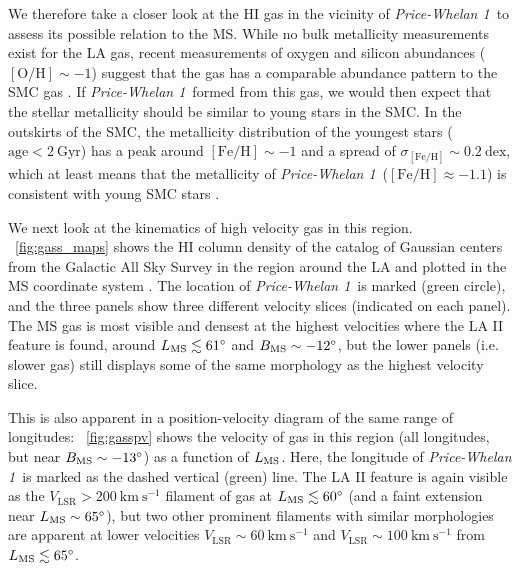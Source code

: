 \documentclass[twocolumn]{aastex62}
\newcommand{\kms}{\ensuremath{\textrm{km}~\textrm{s}^{-1}}}
\newcommand{\feh}{\ensuremath{[\textrm{Fe} / \textrm{H}]}}
\newcommand{\hi}{H{\footnotesize I} }
\newcommand{\clustername}{\textsl{Price-Whelan 1}}
\begin{document}
We therefore take a closer look at the \hi gas in the vicinity of \clustername\ to assess its possible relation to the MS.
While no bulk metallicity measurements exist for the LA gas, recent measurements of oxygen and silicon abundances ($[\textrm{O}/\textrm{H}] \sim -1$) suggest that the gas has a comparable abundance pattern to the SMC gas \citep{Fox:2013, Fox:2018, Richter:2018}.
If \clustername\ formed from this gas, we would then expect that the stellar metallicity should be similar to young stars in the SMC.
In the outskirts of the SMC, the metallicity distribution of the youngest stars ($\textrm{age} < 2~\textrm{Gyr}$) has a peak around $\feh \sim -1$ and a spread of $\sigma_{\feh} \sim 0.2~\textrm{dex}$, which at least means that the metallicity of \clustername\ ($\feh \approx -1.1$) is consistent with young SMC stars \citep{Dobbie:2014}.

We next look at the kinematics of high velocity gas in this region.
\figurename~\ref{fig:gass_maps} shows the \hi column density of the catalog of Gaussian centers \citep[producted with the techniques and software from][]{Nidever:2008} from the Galactic All Sky Survey \citep[GASS;][]{McClure-Griffiths:2009, Kalberla:2010} in the region around the LA and plotted in the MS coordinate system \citep[$L_{\rm MS}, B_{\rm MS}$;][]{Nidever:2008}.
The location of \clustername\ is marked (green circle), and the three panels show three different velocity slices (indicated on each panel).
The MS gas is most visible and densest at the highest velocities where the LA II feature is found, around $L_{\rm MS} \lesssim 61^\circ$ and $B_{\rm MS} \sim -12^\circ$, but the lower panels (i.e. slower gas) still displays some of the same morphology as the highest velocity slice.

This is also apparent in a position-velocity diagram of the same range of longitudes:
\figurename~\ref{fig:gasspv} shows the velocity of gas in this region (all longitudes, but near $B_{\rm MS} \sim -13^\circ$) as a function of $L_{\rm MS}$.
Here, the longitude of \clustername\ is marked as the dashed vertical (green) line.
The LA II feature is again visible as the $V_{\textrm{LSR}} > 200~\kms$ filament of gas at $L_{\rm MS} \lesssim 60^\circ$ (and a faint extension near $L_{\rm MS} \sim 65^\circ$), but two other prominent filaments with similar morphologies are apparent at lower velocities $V_{\textrm{LSR}} \sim 60~\kms$ and $V_{\textrm{LSR}} \sim 100~\kms$ from $L_{\rm MS} \lesssim 65^\circ$.
\end{document}
